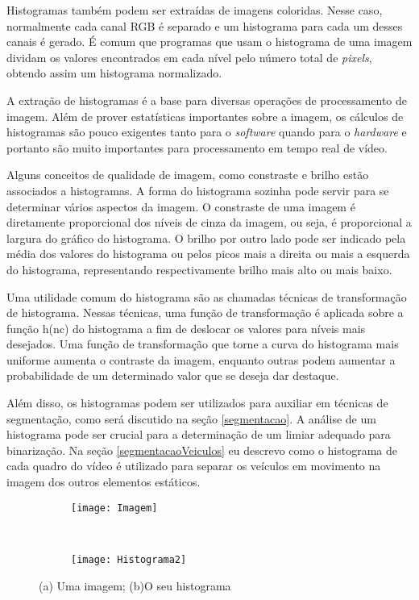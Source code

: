         Histogramas também podem ser extraídas de imagens coloridas. Nesse caso, normalmente cada canal RGB é separado e um histograma para cada um desses canais é gerado. É comum que programas que usam o histograma de uma imagem dividam os valores encontrados em cada nível pelo número total  de \textit{pixels}, obtendo assim um histograma normalizado.

        A extração de histogramas é a base para diversas operações de processamento de imagem. Além de prover estatísticas importantes sobre a imagem, os cálculos de histogramas são pouco exigentes tanto para o \textit{software} quando para o \textit{hardware} e portanto são muito importantes para processamento em tempo real de vídeo.

        Alguns conceitos de qualidade de imagem, como constraste e brilho estão associados a histogramas. A forma do histograma sozinha pode servir para se determinar vários aspectos da imagem. O constraste de uma imagem é diretamente proporcional dos níveis de cinza da imagem, ou seja, é proporcional a largura do gráfico do histograma. O brilho por outro lado pode ser indicado pela média dos valores do histograma ou pelos picos mais a direita ou mais a esquerda do histograma, representando respectivamente brilho mais alto ou mais baixo.

        Uma utilidade comum do histograma são as chamadas técnicas de transformação de histograma. Nessas técnicas, uma função de transformação é aplicada sobre a função h(nc) do histograma a fim de deslocar os valores para níveis mais desejados. Uma função de transformação que torne a curva do histograma mais uniforme aumenta o contraste da imagem, enquanto outras podem aumentar a probabilidade de um determinado valor que se deseja dar destaque.

        Além disso, os histogramas podem ser utilizados para auxiliar em técnicas de segmentação, como será discutido na seção \ref{segmentacao}. A análise de um histograma pode ser crucial para a determinação de um limiar adequado para binarização. Na seção \ref{segmentacaoVeiculos} eu descrevo como o histograma de cada quadro do vídeo é utilizado para separar os veículos em movimento na imagem dos outros elementos estáticos.

\begin{figure}
 \centering
\begin{subfigure}{.5\textwidth}
  \centering
  \texttt{[image: Imagem]}
  \caption{}
  \label{histograma:sfig1}
\end{subfigure}\


\begin{subfigure}{.5\textwidth}
  \centering
  \texttt{[image: Histograma2]}
  \caption{}
  \label{histograma:sfig2}
\end{subfigure}
\caption{(a) Uma imagem; (b)O seu histograma \cite{marques1999processamento}}
\label{HistogramaFig}
\end{figure}

